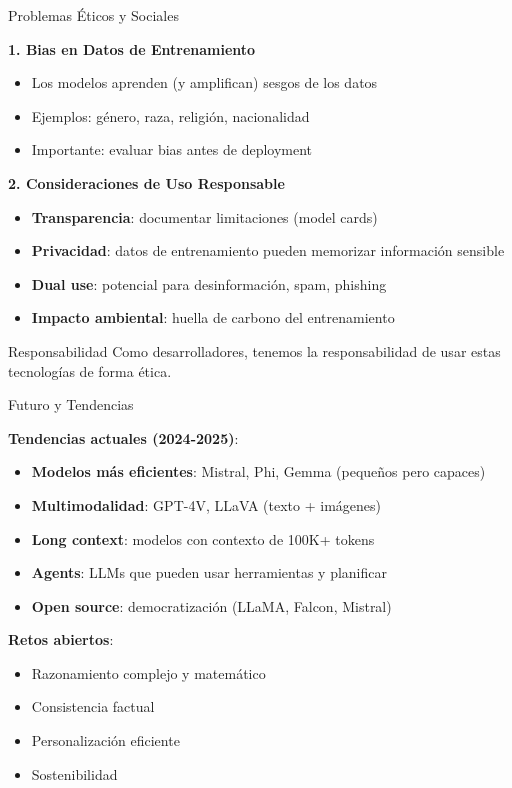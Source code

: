 \begin{frame}{Problemas Éticos y Sociales}

\textbf{1. Bias en Datos de Entrenamiento}
\begin{itemize}
    \item Los modelos aprenden (y amplifican) sesgos de los datos
    \item Ejemplos: género, raza, religión, nacionalidad
    \item Importante: evaluar bias antes de deployment
\end{itemize}

\vspace{0.5em}

\textbf{2. Consideraciones de Uso Responsable}
\begin{itemize}
    \item \textbf{Transparencia}: documentar limitaciones (model cards)
    \item \textbf{Privacidad}: datos de entrenamiento pueden memorizar información sensible
    \item \textbf{Dual use}: potencial para desinformación, spam, phishing
    \item \textbf{Impacto ambiental}: huella de carbono del entrenamiento
\end{itemize}

\vspace{0.5em}

\begin{alertblock}{Responsabilidad}
Como desarrolladores, tenemos la responsabilidad de usar estas tecnologías de forma ética.
\end{alertblock}

\end{frame}

\begin{frame}{Futuro y Tendencias}

\textbf{Tendencias actuales (2024-2025)}:
\begin{itemize}
    \item \textbf{Modelos más eficientes}: Mistral, Phi, Gemma (pequeños pero capaces)
    \item \textbf{Multimodalidad}: GPT-4V, LLaVA (texto + imágenes)
    \item \textbf{Long context}: modelos con contexto de 100K+ tokens
    \item \textbf{Agents}: LLMs que pueden usar herramientas y planificar
    \item \textbf{Open source}: democratización (LLaMA, Falcon, Mistral)
\end{itemize}

\vspace{0.5em}

\textbf{Retos abiertos}:
\begin{itemize}
    \item Razonamiento complejo y matemático
    \item Consistencia factual
    \item Personalización eficiente
    \item Sostenibilidad
\end{itemize}

\end{frame}

